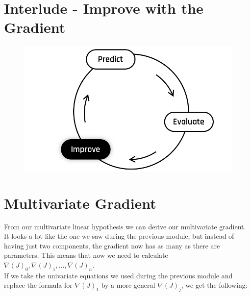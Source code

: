 
\section*{Interlude - Improve with the Gradient}

\begin{figure}[!h]
    \centering
    \includegraphics[scale=0.2]{assets/Improve.png}
\end{figure}

\section*{Multivariate Gradient}
From our multivariate linear hypothesis we can derive our multivariate gradient.
It looks a lot like the one we saw during the previous module, but instead of having just two components, the gradient now has as many as there are parameters.
This means that now we need to calculate $\nabla(J)_0,\nabla(J)_1,\dots,\nabla(J)_n$.\\
\newline
If we take the univariate equations we used during the previous module and replace the formula for $\nabla(J)_1$ by a more general $\nabla(J)_j$, we get the following:

